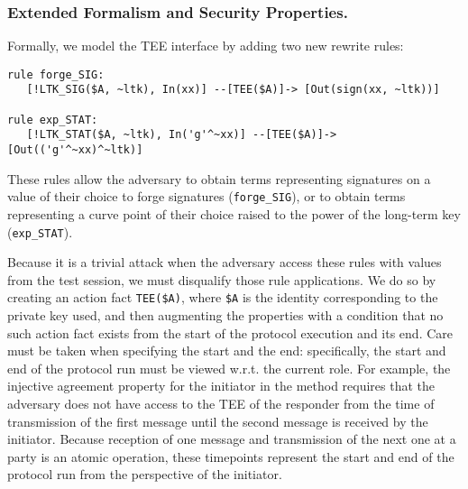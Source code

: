 \subsubsection{Extended Formalism and Security Properties.}
\label{sec:TEE:fmAndProps}
Formally, we model the TEE interface by adding two new rewrite rules:
%
\begin{small}
\begin{verbatim}
rule forge_SIG:
   [!LTK_SIG($A, ~ltk), In(xx)] --[TEE($A)]-> [Out(sign(xx, ~ltk))]

rule exp_STAT:
   [!LTK_STAT($A, ~ltk), In('g'^~xx)] --[TEE($A)]-> [Out(('g'^~xx)^~ltk)]
\end{verbatim}
\end{small}
%
These rules allow the adversary to obtain terms representing signatures on a
value of their choice to forge signatures (\verb|forge_SIG|), or to obtain terms
representing a curve point of their choice raised to the power of the
long-term key (\verb|exp_STAT|).
%

Because it is a trivial attack when the adversary access these rules with values
from the test session, we must disqualify those rule applications.
%
We do so by creating an action fact \verb|TEE($A)|, where \verb|$A| is the
identity corresponding to the private key used, and then augmenting the
properties with a condition that no such action fact exists from the start of
the protocol execution and its end.
%
Care must be taken when specifying the start and the end: specifically,
the start and end of the protocol run must be viewed w.r.t. the current
role.
%
For example, the injective agreement property for the initiator in
the \mSigSig{} method requires that the adversary does not have access to the
TEE of the responder from the time of transmission of the first message until
the second message is received by the initiator.
%
Because reception of one message and transmission of the next one at a party
is an atomic operation, these timepoints represent the start and end of the
protocol run from the perspective of the initiator.
%


